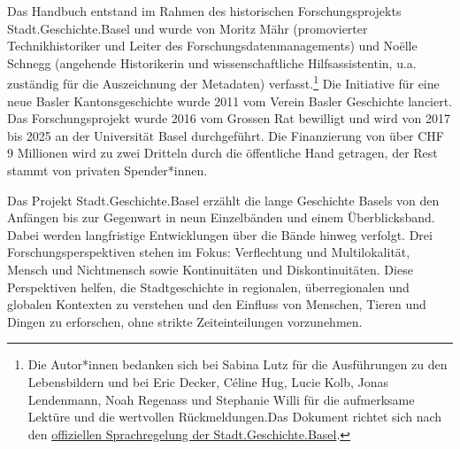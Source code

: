 \documentclass[
  nswissgerman,
  letterpaper,
  DIV=11,
  numbers=noendperiod]{scrartcl}
\begin{document}
Das Handbuch entstand im Rahmen des historischen Forschungsprojekts
Stadt.Geschichte.Basel und wurde von Moritz Mähr (promovierter
Technikhistoriker und Leiter des Forschungsdatenmanagements) und Noëlle
Schnegg (angehende Historikerin und wissenschaftliche Hilfsassistentin,
u.a. zuständig für die Auszeichnung der Metadaten) verfasst.\footnote{Die
  Autor*innen bedanken sich bei Sabina Lutz für die Ausführungen zu den
  Lebensbildern und bei Eric Decker, Céline Hug, Lucie Kolb, Jonas
  Lendenmann, Noah Regenass und Stephanie Willi für die aufmerksame
  Lektüre und die wertvollen Rückmeldungen.Das Dokument richtet sich
  nach den
  \href{https://stadtgeschichtebasel.ch/sprachregelung-der-stadt-geschichte-basel}{offiziellen
  Sprachregelung der Stadt.Geschichte.Basel}.} Die Initiative für eine
neue Basler Kantonsgeschichte wurde 2011 vom Verein Basler Geschichte
lanciert. Das Forschungsprojekt wurde 2016 vom Grossen Rat bewilligt und
wird von 2017 bis 2025 an der Universität Basel durchgeführt. Die
Finanzierung von über CHF 9 Millionen wird zu zwei Dritteln durch die
öffentliche Hand getragen, der Rest stammt von privaten Spender*innen.

Das Projekt Stadt.Geschichte.Basel erzählt die lange Geschichte Basels
von den Anfängen bis zur Gegenwart in neun Einzelbänden und einem
Überblicksband. Dabei werden langfristige Entwicklungen über die Bände
hinweg verfolgt. Drei Forschungsperspektiven stehen im Fokus:
Verflechtung und Multilokalität, Mensch und Nichtmensch sowie
Kontinuitäten und Diskontinuitäten. Diese Perspektiven helfen, die
Stadtgeschichte in regionalen, überregionalen und globalen Kontexten zu
verstehen und den Einfluss von Menschen, Tieren und Dingen zu
erforschen, ohne strikte Zeiteinteilungen vorzunehmen.
\end{document}
